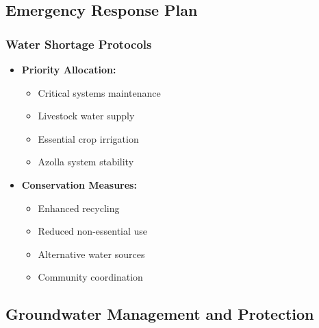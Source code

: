 \subsection{Emergency Response Plan}

\subsubsection{Water Shortage Protocols}
\begin{itemize}
    \item \textbf{Priority Allocation:}
    \begin{itemize}
        \item Critical systems maintenance
        \item Livestock water supply
        \item Essential crop irrigation
        \item Azolla system stability
    \end{itemize}
    
    \item \textbf{Conservation Measures:}
    \begin{itemize}
        \item Enhanced recycling
        \item Reduced non-essential use
        \item Alternative water sources
        \item Community coordination
    \end{itemize}
\end{itemize}

\subsection{Groundwater Management and Protection}

